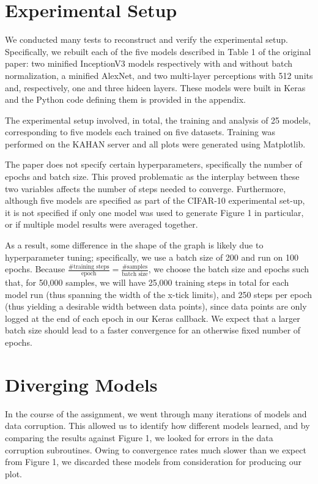 \documentclass[12pt]{article}
\begin{document}
\section{Experimental Setup}

We conducted many tests to reconstruct and verify the experimental setup. Specifically, we rebuilt each of the five models described in Table 1 of the original paper: two minified InceptionV3 models respectively with and without batch normalization, a minified AlexNet, and two multi-layer perceptions with 512 units and, respectively, one and three hideen layers. These models were built in Keras and the Python code defining them is provided in the appendix.

The experimental setup involved, in total, the training and analysis of 25 models, corresponding to five models each trained on five datasets. Training was performed on the KAHAN server and all plots were generated using Matplotlib.

The paper does not specify certain hyperparameters, specifically the number of epochs and batch size. This proved problematic as the interplay between these two variables affects the number of steps needed to converge. Furthermore, although five models are specified as part of the CIFAR-10 experimental set-up, it is not specified if only one model was used to generate Figure 1 in particular, or if multiple model results were averaged together.

As a result, some difference in the shape of the graph is likely due to hyperparameter tuning; specifically, we use a batch size of 200 and run on 100 epochs. Because $\frac{\text{\# training steps}}{\text{epoch}} = \frac{\text{\# samples}}{\text{batch size}}$, we choose the batch size and epochs such that, for 50,000 samples, we will have 25,000 training steps in total for each model run (thus spanning the width of the x-tick limits), and 250 steps per epoch (thus yielding a desirable width between data points), since data points are only logged at the end of each epoch in our Keras callback. We expect that a larger batch size should lead to a faster convergence for an otherwise fixed number of epochs.

\section{Diverging Models}

In the course of the assignment, we went through many iterations of models and data corruption. This allowed us to identify how different models learned, and by comparing the results against Figure 1, we looked for errors in the data corruption subroutines. Owing to convergence rates much slower than we expect from Figure 1, we discarded these models from consideration for producing our plot.
\end{document}
